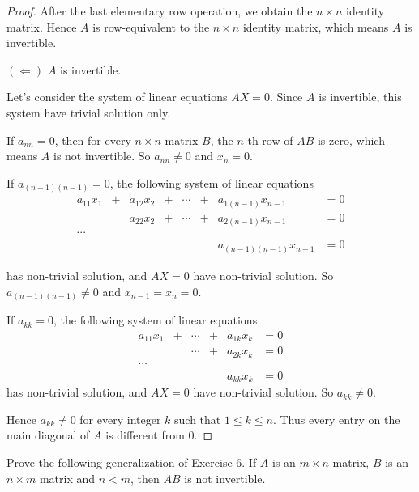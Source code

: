 \begin{proof}
    After the last elementary row operation, we obtain the $n\times n$ identity matrix. Hence $A$ is row-equivalent to the $n\times n$ identity matrix, which means $A$ is invertible.

    \bigskip

    $(\Leftarrow)$ $A$ is invertible.

    Let's consider the system of linear equations $AX = 0$. Since $A$ is invertible, this system have trivial solution only.

    If $a_{nn} = 0$, then for every $n\times n$ matrix $B$, the $n$-th row of $AB$ is zero, which means $A$ is not invertible. So $a_{nn}\ne 0$ and $x_{n} = 0$.

    If $a_{(n-1)(n-1)} = 0$, the following system of linear equations
    \[
        \begin{array}{cccccccc}
            a_{11}x_{1} & + & a_{12}x_{2} & + & \cdots & + & a_{1(n-1)}x_{n-1}     & = 0 \\
                        &   & a_{22}x_{2} & + & \cdots & + & a_{2(n-1)}x_{n-1}     & = 0 \\
            \cdots                                                                       \\
                        &   &             &   &        &   & a_{(n-1)(n-1)}x_{n-1} & = 0
        \end{array}
    \]

    has non-trivial solution, and $AX = 0$ have non-trivial solution. So $a_{(n-1)(n-1)}\ne 0$ and $x_{n-1} = x_{n} = 0$.

    If $a_{kk} = 0$, the following system of linear equations
    \[
        \begin{array}{cccccc}
            a_{11}x_{1} & + & \cdots & + & a_{1k}x_{k} & = 0 \\
                        &   & \cdots & + & a_{2k}x_{k} & = 0 \\
            \cdots                                           \\
                        &   &        &   & a_{kk}x_{k} & = 0
        \end{array}
    \]
    has non-trivial solution, and $AX = 0$ have non-trivial solution. So $a_{kk}\ne 0$.

    Hence $a_{kk}\ne 0$ for every integer $k$ such that $1\le k \le n$. Thus every entry on the main diagonal of $A$ is different from $0$.
\end{proof}

\begin{exercise}
    Prove the following generalization of Exercise 6. If $A$ is an $m\times n$ matrix, $B$ is an $n\times m$ matrix and $n < m$, then $AB$ is not invertible.
\end{exercise}

